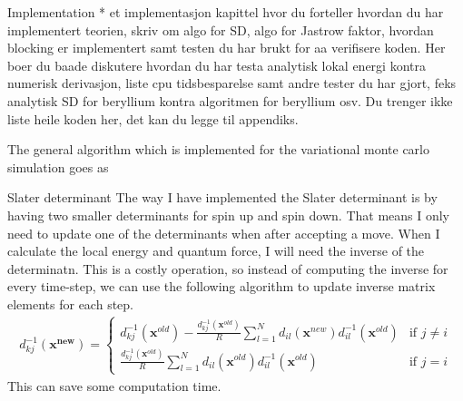 \documentclass[a4paper, 12pt, titlepage]{article}
\begin{document}
\begin{section}{Implementation}
  * et implementasjon kapittel hvor du forteller hvordan du har implementert teorien, skriv om algo for SD, algo for Jastrow faktor, hvordan blocking er implementert samt testen du har brukt for aa verifisere koden. Her boer du baade diskutere hvordan du har testa analytisk lokal energi kontra numerisk derivasjon, liste cpu tidsbesparelse samt andre tester du har gjort, feks analytisk SD for beryllium kontra algoritmen for beryllium osv. Du trenger ikke liste heile koden her, det kan du legge til appendiks. 

  The general algorithm which is implemented for the variational monte carlo simulation goes as


 \begin{subsection}{Slater determinant}
 	The way I have implemented the Slater determinant is by having two smaller determinants for spin up and spin down. That means I only need to update one of the determinants when after accepting a move. When I calculate the local energy and quantum force, I will need the inverse of the determinatn. This is a costly operation, so instead of computing the inverse for every time-step, we can use the following algorithm to update inverse matrix elements for each step. 
 	\begin{align}
 		d_{kj}^{-1}(\mathbf{x^{new}}) = \left\{
	\begin{array}{ll}
		d_{kj}^{-1}(\mathbf{x}^{old}) - \frac{d_{kj}^{-1}(\mathbf{x}^{old})}{R} \sum_{l=1}^N d_{il}(\mathbf{x}^{new})d_{il}^{-1}(\mathbf{x}^{old})  & \mbox{if } j \neq i \\
		\frac{d_{kj}^{-1}(\mathbf{x}^{old})}{R} \sum_{l=1}^N d_{il}(\mathbf{x}^{old})d_{il}^{-1}(\mathbf{x}^{old}) & \mbox{if } j = i
	\end{array}
	\right.
 	\end{align}
 	This can save some computation time. 
 \end{subsection}


\end{section}
\end{document}
